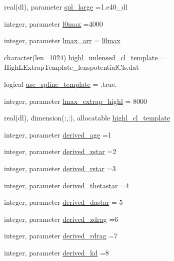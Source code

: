 \begin{DoxyCompactItemize}
\item 
real(dl), parameter \mbox{\hyperlink{namespacemodelparams_a1385cd79ec8a583c0e723a87e6dd5a78}{spl\+\_\+large}} =1.e40\+\_\+dl
\item 
integer, parameter \mbox{\hyperlink{namespacemodelparams_af523f2835472798b89ae123214d8fb99}{l0max}} =4000
\item 
integer, parameter \mbox{\hyperlink{namespacemodelparams_a68d9b09cb50a8117d4eba3f1dc224627}{lmax\+\_\+arr}} = \mbox{\hyperlink{namespacemodelparams_af523f2835472798b89ae123214d8fb99}{l0max}}
\item 
character(len=1024) \mbox{\hyperlink{namespacemodelparams_af0393446db4ef6a4d9b6ea1e107447dd}{highl\+\_\+unlensed\+\_\+cl\+\_\+template}} = \textquotesingle{}High\+L\+Extrap\+Template\+\_\+lenspotential\+Cls.\+dat\textquotesingle{}
\item 
logical \mbox{\hyperlink{namespacemodelparams_a11a5af696bd0ff15b97767839562048e}{use\+\_\+spline\+\_\+template}} = .true.
\item 
integer, parameter \mbox{\hyperlink{namespacemodelparams_a773455ee2416a2e08be5835a1c92fccd}{lmax\+\_\+extrap\+\_\+highl}} = 8000
\item 
real(dl), dimension(\+:,\+:), allocatable \mbox{\hyperlink{namespacemodelparams_ac21d168dd37c9a2ef9fef53a5ba08c3c}{highl\+\_\+cl\+\_\+template}}
\item 
integer, parameter \mbox{\hyperlink{namespacemodelparams_afcc43d2b71977053be4631323ffeafbc}{derived\+\_\+age}} =1
\item 
integer, parameter \mbox{\hyperlink{namespacemodelparams_a179ecd2347ad710da08fc22b9d583f02}{derived\+\_\+zstar}} =2
\item 
integer, parameter \mbox{\hyperlink{namespacemodelparams_a0a96c00fb37f393bad015179acb69747}{derived\+\_\+rstar}} =3
\item 
integer, parameter \mbox{\hyperlink{namespacemodelparams_af8cbef6429fb7ceac03aa8fe7d0d9875}{derived\+\_\+thetastar}} =4
\item 
integer, parameter \mbox{\hyperlink{namespacemodelparams_a81273461b08fe58e73e36d844c62fe7f}{derived\+\_\+dastar}} = 5
\item 
integer, parameter \mbox{\hyperlink{namespacemodelparams_a9a7e7cdc5d12b5f40bff2ae559319e44}{derived\+\_\+zdrag}} =6
\item 
integer, parameter \mbox{\hyperlink{namespacemodelparams_a902eadf9e7fd31eb1ebd3e02ac0e443b}{derived\+\_\+rdrag}} =7
\item 
integer, parameter \mbox{\hyperlink{namespacemodelparams_a709313f88097e1ea1da03d031977d39d}{derived\+\_\+kd}} =8

\end{DoxyCompactItemize}

